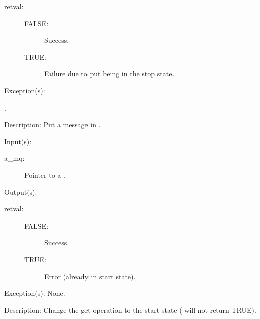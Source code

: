 \begin{capi}
\begin{capilist}
		\begin{description}\item[]
		\item[retval: ]
			\begin{description}\item[]
			\item[FALSE: ] Success.
			\item[TRUE: ] Failure due to put being in the stop
				state.
			\end{description}
		\end{description}
	\item[Exception(s): ]
		\begin{description}\item[]
		\item[.]
		\end{description}
	\item[Description: ]
		Put a message in .
	\end{capilist}
\label{mq_get_start}
	\begin{capilist}
	\item[Input(s): ]
		\begin{description}\item[]
		\item[a\_mq: ]
			Pointer to a .
		\end{description}
	\item[Output(s): ]
		\begin{description}\item[]
		\item[retval: ]
			\begin{description}\item[]
			\item[FALSE: ] Success.
			\item[TRUE: ] Error (already in start state).
			\end{description}
		\end{description}
	\item[Exception(s): ] None.
	\item[Description: ]
		Change the get operation to the start state
		( will not return TRUE).
	\end{capilist}
\label{mq_get_stop}
	\begin{capilist}

\end{capilist}
\end{capi}
